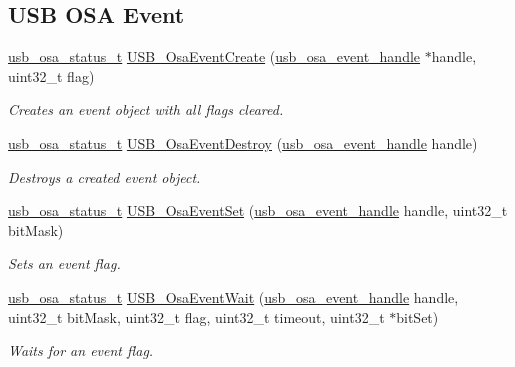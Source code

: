 \subsection*{U\-S\-B O\-S\-A Event}
\begin{DoxyCompactItemize}
\item 
\hyperlink{group__usb__os__abstraction_ga8de2fb7579de0a6621bbc1776519b0a9}{usb\-\_\-osa\-\_\-status\-\_\-t} \hyperlink{group__usb__os__abstraction_gaf38d525580499ff2657303eb807efc61}{U\-S\-B\-\_\-\-Osa\-Event\-Create} (\hyperlink{group__usb__os__abstraction_gaa5faa1787d0c772a2cf101b3eaf654f6}{usb\-\_\-osa\-\_\-event\-\_\-handle} $\ast$handle, uint32\-\_\-t flag)
\begin{DoxyCompactList}\small\item\em Creates an event object with all flags cleared. \end{DoxyCompactList}\item 
\hyperlink{group__usb__os__abstraction_ga8de2fb7579de0a6621bbc1776519b0a9}{usb\-\_\-osa\-\_\-status\-\_\-t} \hyperlink{group__usb__os__abstraction_ga3d07a809b1fa8450c1383aa8bbd49b37}{U\-S\-B\-\_\-\-Osa\-Event\-Destroy} (\hyperlink{group__usb__os__abstraction_gaa5faa1787d0c772a2cf101b3eaf654f6}{usb\-\_\-osa\-\_\-event\-\_\-handle} handle)
\begin{DoxyCompactList}\small\item\em Destroys a created event object. \end{DoxyCompactList}\item 
\hyperlink{group__usb__os__abstraction_ga8de2fb7579de0a6621bbc1776519b0a9}{usb\-\_\-osa\-\_\-status\-\_\-t} \hyperlink{group__usb__os__abstraction_gaa83073c31cced5742027d4046bd633db}{U\-S\-B\-\_\-\-Osa\-Event\-Set} (\hyperlink{group__usb__os__abstraction_gaa5faa1787d0c772a2cf101b3eaf654f6}{usb\-\_\-osa\-\_\-event\-\_\-handle} handle, uint32\-\_\-t bit\-Mask)
\begin{DoxyCompactList}\small\item\em Sets an event flag. \end{DoxyCompactList}\item 
\hyperlink{group__usb__os__abstraction_ga8de2fb7579de0a6621bbc1776519b0a9}{usb\-\_\-osa\-\_\-status\-\_\-t} \hyperlink{group__usb__os__abstraction_ga5ce587209d676871f3ec62900054febd}{U\-S\-B\-\_\-\-Osa\-Event\-Wait} (\hyperlink{group__usb__os__abstraction_gaa5faa1787d0c772a2cf101b3eaf654f6}{usb\-\_\-osa\-\_\-event\-\_\-handle} handle, uint32\-\_\-t bit\-Mask, uint32\-\_\-t flag, uint32\-\_\-t timeout, uint32\-\_\-t $\ast$bit\-Set)
\begin{DoxyCompactList}\small\item\em Waits for an event flag. \end{DoxyCompactList}\item 

\end{DoxyCompactItemize}
